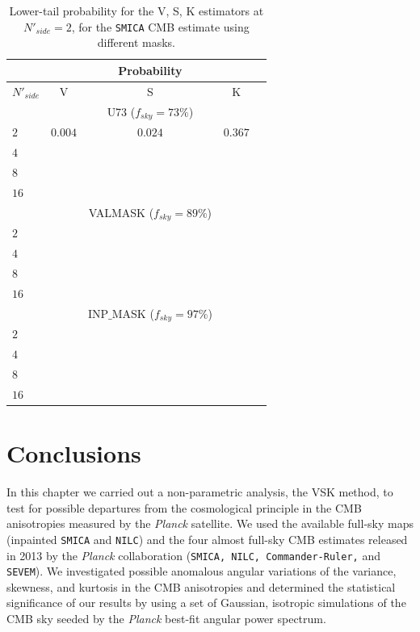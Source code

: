 \begin{table}
\centering
\caption{Lower-tail probability for the V, S, K estimators at $N'_{side}=2$, for the \texttt{SMICA} CMB estimate using different masks.}
\label{table:3}
\begin{tabular}{@{}lcccc}
\hline 
  & & Probability & \\
\hline  
$N'_{side}$ & V & S & K \\ 
\hline  
 & & U73 ($f_{sky} = 73\%$) & \\
$2$ & $ 0.004 $ & $ 0.024 $ & $ 0.367 $ \\ 
$4$ & $  $ & $  $ & $  $  \\
$8$ & $  $ & $  $ & $  $  \\
$16$ & $  $ & $  $ & $  $  \\
 & & VALMASK ($f_{sky} = 89\%$) & \\
$2$ & $  $ & $  $ & $  $ \\ 
$4$ & $  $ & $  $ & $  $  \\
$8$ & $  $ & $  $ & $  $  \\
$16$ & $  $ & $  $ & $  $  \\
 & & INP$\_$MASK ($f_{sky} = 97\%$) & \\
$2$ & $  $ & $  $ & $  $ \\ 
$4$ & $  $ & $  $ & $  $  \\
$8$ & $  $ & $  $ & $  $  \\
$16$ & $  $ & $  $ & $  $  \\
\hline
\end{tabular} 
\end{table}


\section{Conclusions}
\label{s:summary}

In this chapter we carried out a non-parametric analysis, the VSK method, to test for possible departures from the cosmological principle in the CMB anisotropies measured by the \textit{Planck} satellite. We used the available full-sky maps (inpainted \texttt{SMICA} and \texttt{NILC}) and the four almost full-sky CMB estimates released in 2013 by the \textit{Planck} collaboration (\texttt{SMICA, NILC, Commander-Ruler,} and \texttt{SEVEM}). We investigated possible anomalous angular variations of the variance, skewness, and kurtosis in the CMB anisotropies and determined the statistical significance of our results by using a set of Gaussian, isotropic simulations of the CMB sky seeded by the \textit{Planck} best-fit angular power spectrum.    

